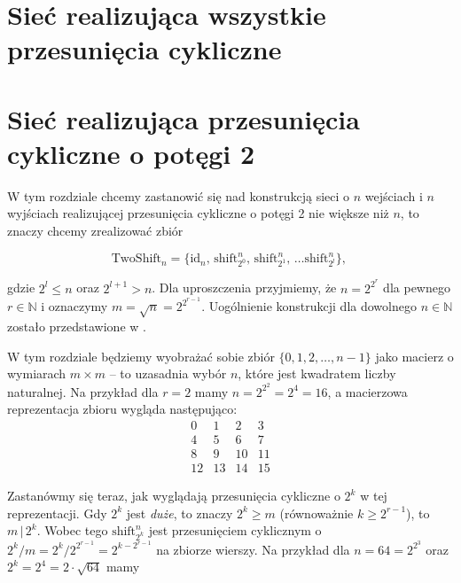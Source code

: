 \documentclass[a4paper]{article}
\newcommand{\shift}[2]{\text{shift}_{#2}^{#1}}
\newcommand{\id}[1]{\text{id}_{#1}}
\newcommand{\tc}{\text{, }}
\newcommand{\twoshift}[1]{\text{TwoShift}_{#1}}
\newcommand{\N}{\mathbb{N}}
\theoremstyle{definition}
\begin{document}

\section{Sieć realizująca wszystkie przesunięcia cykliczne}


\section{Sieć realizująca przesunięcia cykliczne o potęgi 2}

W tym rozdziale chcemy zastanowić się nad konstrukcją sieci o \(n\) wejściach i \(n\) wyjściach realizującej przesunięcia cykliczne o potęgi 2 nie większe niż \(n\), to znaczy chcemy zrealizować zbiór

\[
\twoshift{n} = \{ \id n \tc \shift n {2^0} \tc \shift n {2^1} \tc \ldots \shift n {2^l}\} \tc
\]

gdzie \(2^l \leq n\) oraz \(2^{l+1} > n\). Dla uproszczenia przyjmiemy, że \(n = 2^{2^r}\) dla pewnego \(r \in \N\) i oznaczymy \( m = \sqrt{n} = 2^{2^{r-1}} \). Uogólnienie konstrukcji dla dowolnego \(n \in \N\) zostało przedstawione w \cite{klo}.

\vspace{1em}

W tym rozdziale będziemy wyobrażać sobie zbiór \(\{0, 1, 2, \ldots, n-1\}\) jako macierz o wymiarach \(m \times m\) -- to uzasadnia wybór \(n\), które jest kwadratem liczby naturalnej. Na przykład dla \(r = 2\) mamy \(n = 2^{2^2} = 2^4 = 16\), a macierzowa reprezentacja zbioru wygląda następująco:
\[
\begin{matrix}
 0 &  1 &  2 &  3 \\
 4 &  5 &  6 &  7 \\
 8 &  9 & 10 & 11 \\
12 & 13 & 14 & 15
\end{matrix}
\]

Zastanówmy się teraz, jak wyglądają przesunięcia cykliczne o \(2^k\) w tej reprezentacji. Gdy \(2^k\) jest \textit{duże}, to znaczy \(2^k \geq m\) (równoważnie \(k \geq 2^{r-1}\)), to \(m \, | \, 2^k\). Wobec tego \(\shift n {2^k}\) jest przesunięciem cyklicznym o \(2^k / m = 2^k / 2^{2^{r-1}} = 2^{k - 2^{r-1}}\) na zbiorze wierszy. Na przykład dla \(n = 64 = 2^{2^3}\) oraz \(2^k = 2^4 = 2 \cdot \sqrt{64}\) mamy
\end{document}
